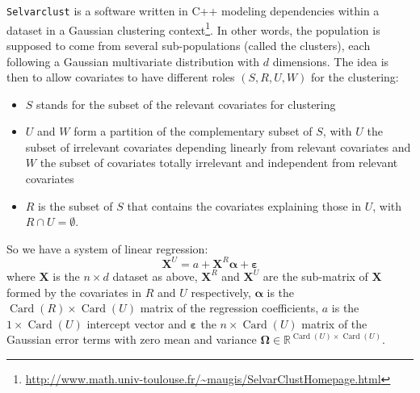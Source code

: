 \documentclass[12pt,a4paper]{report}
\begin{document}
			{\tt Selvarclust} is a software written in C++ modeling dependencies within a dataset			 \cite{maugis2009variable} in a Gaussian clustering context\footnote{\url{http://www.math.univ-toulouse.fr/~maugis/SelvarClustHomepage.html}}. In other words, the population is supposed to come from several sub-populations (called the clusters), each following a Gaussian multivariate distribution with $d$ dimensions.
			The idea is then to allow covariates to have different roles $(S,R,U,W)$ for the clustering:
			\begin{itemize}
				\item $S$ stands for the subset of the relevant covariates for clustering
				\item $U$ and $W$ form a partition of the complementary subset of $S$, with $U$ the subset of irrelevant covariates depending linearly from relevant covariates and $W$ the subset of covariates totally irrelevant and independent from relevant covariates
				\item $R$ is the subset of $S$ that contains the covariates explaining those in $U$, with $R\cap U=\emptyset$.
\end{itemize}			 
So we have a system of linear regression:
\begin{equation}
	\boldsymbol{X}^{U}%
	=a+\boldsymbol{X}^R \boldsymbol{\alpha}+ \boldsymbol{\varepsilon}  \nonumber 
\end{equation}
where $\boldsymbol{X}$ is the $n\times d$ dataset as above, $\boldsymbol{X}^R$ and $\boldsymbol{X}^U$ are the sub-matrix of  $\boldsymbol{X}$ formed by the covariates in $R$ and $U$ respectively, $\boldsymbol{\alpha}$ is the $\operatorname{Card}(R)\times \operatorname{Card}(U)$ matrix of the regression coefficients, $a$ is the $1\times \operatorname{Card}(U)$ intercept vector and $\boldsymbol{\varepsilon}$ the $n\times \operatorname{Card}(U) $ matrix of the Gaussian error terms with zero mean and variance $\boldsymbol{\Omega}\in \mathbb{R}^{\operatorname{Card}(U)\times \operatorname{Card}(U)}$.\\
\end{document}

